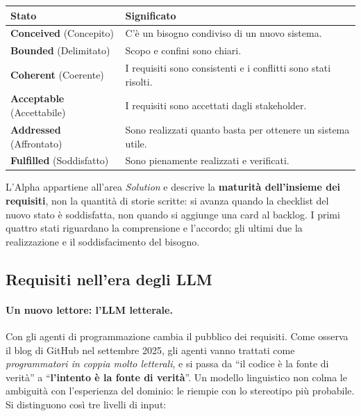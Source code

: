 \documentclass[12pt]{extarticle}
\begin{document}
\begin{center}
\small
\begin{tabular}{p{3.6cm}p{11.6cm}}
    \toprule
    \textbf{Stato} & \textbf{Significato} \\
    \midrule
    \textbf{Conceived} (Concepito) & C'è un bisogno condiviso di un nuovo sistema. \\
    \addlinespace
    \textbf{Bounded} (Delimitato) & Scopo e confini sono chiari. \\
    \addlinespace
    \textbf{Coherent} (Coerente) & I requisiti sono consistenti e i conflitti sono stati risolti. \\
    \addlinespace
    \textbf{Acceptable} (Accettabile) & I requisiti sono accettati dagli stakeholder. \\
    \addlinespace
    \textbf{Addressed} (Affrontato) & Sono realizzati quanto basta per ottenere un sistema utile. \\
    \addlinespace
    \textbf{Fulfilled} (Soddisfatto) & Sono pienamente realizzati e verificati. \\
    \bottomrule
\end{tabular}
\end{center}

\noindent L'Alpha appartiene all'area \textit{Solution} e descrive la \textbf{maturità dell'insieme dei requisiti}, non la quantità di storie scritte: si avanza quando la checklist del nuovo stato è soddisfatta, non quando si aggiunge una card al backlog. I primi quattro stati riguardano la comprensione e l'accordo; gli ultimi due la realizzazione e il soddisfacimento del bisogno.

\subsection{Requisiti nell'era degli LLM}

\paragraph{Un nuovo lettore: l'LLM letterale.}
Con gli agenti di programmazione cambia il pubblico dei requisiti. Come osserva il blog di GitHub nel settembre 2025, gli agenti vanno trattati come \textit{programmatori in coppia molto letterali}, e si passa da ``il codice è la fonte di verità'' a ``\textbf{l'intento è la fonte di verità}''. Un modello linguistico non colma le ambiguità con l'esperienza del dominio: le riempie con lo stereotipo più probabile. Si distinguono così tre livelli di input:
\end{document}
